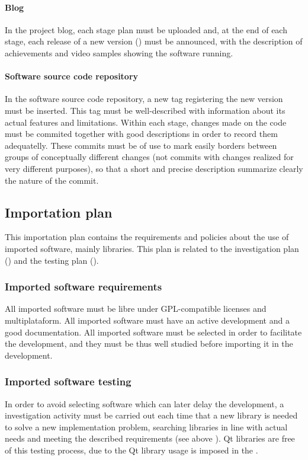\documentclass[twocolumn, 9pt]{extarticle}
\begin{document}
\paragraph{Blog}
\label{par:blog}
In the project blog, each stage plan must be uploaded and, at the end
of each stage, each release of a new version ()
must be announced, with the description of achievements and video
samples showing the software running.

\paragraph{Software source code repository}
\label{par:software-source-code-repository}
In the software source code repository, a new tag registering the new
version must be inserted. This tag must be well-described with
information about its actual features and limitations. Within each
stage, changes made on the code must be commited together with good
descriptions in order to record them adequatelly. These commits must
be of use to mark easily borders between groups of conceptually
different changes (not commits with changes realized for
very different purposes), so that a short and precise description
summarize clearly the nature of the commit.

\subsection{Importation plan}
\label{ssec:importation-plan}
This importation plan contains the requirements and policies about the
use of imported software, mainly libraries. This plan is related to
the investigation plan () and the
testing plan ().

\subsubsection{Imported software requirements}
\label{sssec:imported-software-requirements}
All imported software must be libre under GPL-compatible
licenses and multiplataform. All imported software must have an active
development and a good documentation. All imported software must be
selected in order to facilitate the development, and they must be thus
well studied before importing it in the \fav development.

\subsubsection{Imported software testing}
\label{sssec:imported-software-testing}
In order to avoid selecting software which can later delay the
development, a investigation activity must be carried out each time
that a new library is needed to solve a new implementation problem,
searching libraries in line with actual needs and meeting the
described requirements (see above
). Qt libraries are free
of this testing process, due to the Qt library usage is imposed in the
\favc.
\end{document}
